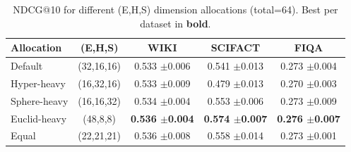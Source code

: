 \begin{table}[t]
\caption{NDCG@10 for different (E,H,S) dimension allocations (total=64). Best per dataset in \textbf{bold}.}
\label{tab:ablation_allocation}
\centering
\small
\begin{tabular}{lcccc}
\toprule
Allocation & (E,H,S) & WIKI & SCIFACT & FIQA \\
\midrule
Default & (32,16,16) & 0.533 {\scriptsize$\pm$0.006} & 0.541 {\scriptsize$\pm$0.013} & 0.273 {\scriptsize$\pm$0.004} \\
Hyper-heavy & (16,32,16) & 0.533 {\scriptsize$\pm$0.009} & 0.479 {\scriptsize$\pm$0.013} & 0.270 {\scriptsize$\pm$0.003} \\
Sphere-heavy & (16,16,32) & 0.534 {\scriptsize$\pm$0.004} & 0.553 {\scriptsize$\pm$0.006} & 0.273 {\scriptsize$\pm$0.009} \\
Euclid-heavy & (48,8,8) & \textbf{0.536 {\scriptsize$\pm$0.004}} & \textbf{0.574 {\scriptsize$\pm$0.007}} & \textbf{0.276 {\scriptsize$\pm$0.007}} \\
Equal & (22,21,21) & 0.536 {\scriptsize$\pm$0.008} & 0.558 {\scriptsize$\pm$0.014} & 0.273 {\scriptsize$\pm$0.001} \\
\bottomrule
\end{tabular}
\end{table}